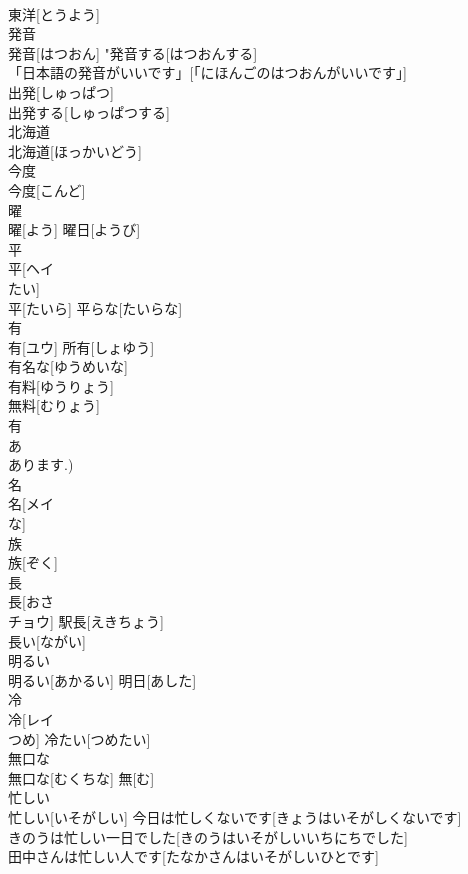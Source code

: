 \documentclass[8pt]{extreport}
\begin{document}
\begin{CJK}{UTF8}{min}
\\	東洋[とうよう]	
\\	発音	
\\	発音[はつおん]	"発音する[はつおんする] 
\\	「日本語の発音がいいです」[「にほんごのはつおんがいいです」] 
\\	出発[しゅっぱつ] 
\\	出発する[しゅっぱつする] 
\\	北海道	
\\	北海道[ほっかいどう]	
\\	今度	
\\	今度[こんど]	
\\	曜	
\\	曜[よう]	曜日[ようび] 
\\	平	
\\	平[ヘイ 
\\	たい] 
\\	平[たいら]	平らな[たいらな] 
\\	有	
\\	有[ユウ]	所有[しょゆう] 
\\	有名な[ゆうめいな] 
\\	有料[ゆうりょう] 
\\	無料[むりょう] 
\\	有 
\\	あ 
\\	あります.)
\\	名	
\\	名[メイ 
\\	な]	
\\	族	
\\	族[ぞく]	
\\	長	
\\	長[おさ 
\\	チョウ]	駅長[えきちょう] 
\\	長い[ながい] 
\\	明るい	
\\	明るい[あかるい]	明日[あした] 
\\	冷	
\\	冷[レイ 
\\	つめ]	冷たい[つめたい] 
\\	無口な	
\\	無口な[むくちな]	無[む] 
\\	忙しい	
\\	忙しい[いそがしい]	今日は忙しくないです[きょうはいそがしくないです] 
\\	きのうは忙しい一日でした[きのうはいそがしいいちにちでした] 
\\	田中さんは忙しい人です[たなかさんはいそがしいひとです] 

\end{CJK}
\end{document}

